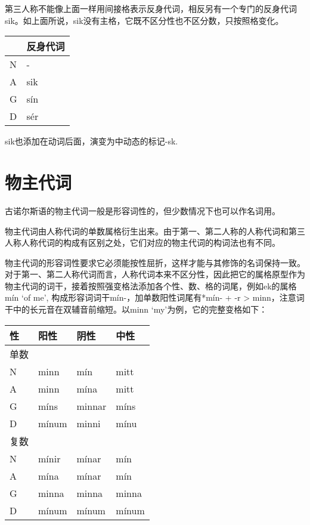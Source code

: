 第三人称不能像上面一样用间接格表示反身代词，相反另有一个专门的反身代词sik。如上面所说，sik没有主格，它既不区分性也不区分数，只按照格变化。

\begin{longtable}{ll}
    \toprule
      & 反身代词 \\
    \midrule
    \endhead
    \bottomrule
    \endfoot
    N & -        \\
    A & sik      \\
    G & sín      \\
    D & sér      \\
\end{longtable}

sik也添加在动词后面，演变为中动态的标记-sk.

\section{物主代词}\label{物主代词}

古诺尔斯语的物主代词一般是形容词性的，但少数情况下也可以作名词用。

物主代词由人称代词的单数属格衍生出来。由于第一、第二人称的人称代词和第三人称人称代词的构成有区别之处，它们对应的物主代词的构词法也有不同。

物主代词的形容词性要求它必须能按性屈折，这样才能与其修饰的名词保持一致。对于第一、第二人称代词而言，人称代词本来不区分性，因此把它的属格原型作为物主代词的词干，接着按照强变格法添加各个性、数、格的词尾，例如ek的属格mín `of me‌', 构成形容词词干mín-，加单数阳性词尾有*mín- + -r > minn，注意词干中的长元音在双辅音前缩短。以minn `my‌'为例，它的完整变格如下：

\begin{longtable}{llll}
    \toprule
    性   & 阳性  & 阴性   & 中性  \\
    \midrule
    \endhead
    \bottomrule
    \endfoot
    单数 &       &        &       \\
    N    & minn  & mín    & mitt  \\
    A    & minn  & mína   & mitt  \\
    G    & míns  & minnar & míns  \\
    D    & mínum & minni  & mínu  \\
    复数 &       &        &       \\
    N    & mínir & mínar  & mín   \\
    A    & mína  & mínar  & mín   \\
    G    & minna & minna  & minna \\
    D    & mínum & mínum  & mínum \\
\end{longtable}

